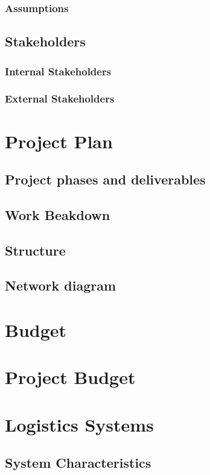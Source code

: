 \documentclass{article}
\begin{document}
  \subsubsection{Assumptions}
  \subsection{Stakeholders}
  \subsubsection{Internal Stakeholders}
  \subsubsection{External Stakeholders}

  \newpage
  \section{Project Plan}
  \subsection{Project phases and deliverables}
  \subsection{Work Beakdown}
  \subsection{Structure}
  \subsection{Network diagram}

  \newpage{}
  \section{Budget}

  \newpage{}
  \section{Project Budget}

  \newpage{}
  \section{Logistics Systems}
  \subsection{System Characteristics}
  \newpage
\end{document}
